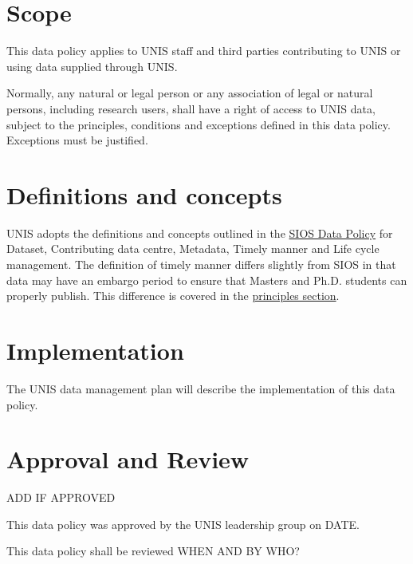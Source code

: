 \documentclass[a4paper,english, 11pt]{article}
\begin{document}
\section{Scope}
\label{s:scope}

This data policy applies to UNIS staff and third parties contributing to UNIS or using data supplied through UNIS.

Normally, any natural or legal person or any association of legal or natural persons, including
research users, shall have a right of access to UNIS data, subject to the
principles, conditions and exceptions defined in this data policy. Exceptions must be justified.

\section{Definitions and concepts}
\label{s:def}

UNIS adopts the definitions and concepts outlined in the \href{https://sios-svalbard.org/sites/sios-svalbard.org/files/common/SIOS_Data_Policy.pdf}{SIOS Data Policy} for Dataset, Contributing data centre, Metadata, Timely manner and Life cycle management. The definition of timely manner differs slightly from SIOS in that data may have an embargo period to ensure that Masters and Ph.D. students can properly publish. This difference is covered in the \hyperref[s:principles]{principles section}.

\section{Implementation}
\label{s:implementation}

The UNIS data management plan will describe the implementation of this data policy.

\section{Approval and Review}
\label{s:approval}

ADD IF APPROVED

This data policy was approved by the UNIS leadership group on DATE. 

This data policy shall be reviewed WHEN AND BY WHO?
\end{document}
